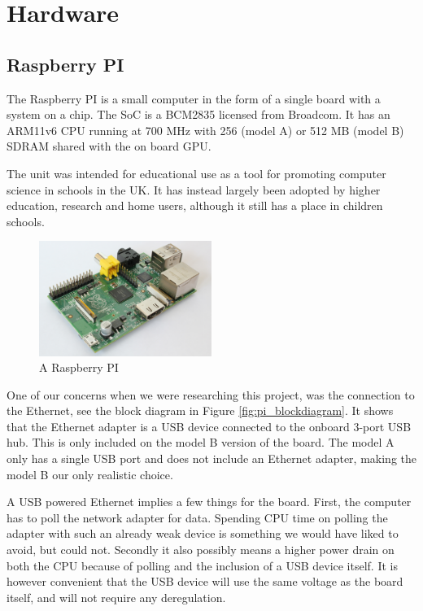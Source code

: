 \clearpage
\section{Hardware}
\label{sec:hardware}

\subsection{Raspberry PI}
The Raspberry PI is a small computer in the form of a single board with a system on a chip. The SoC is a BCM2835 licensed from Broadcom. It has an ARM11v6 CPU running at 700 MHz with 256 (model A) or 512 MB (model B) SDRAM shared with the on board GPU. 

The unit was intended for educational use as a tool for promoting computer science in schools in the UK. It has instead largely been adopted by higher education, research and home users, although it still has a place in children schools.

\begin{figure}[h]
    \centering
    \includegraphics[width=0.5\textwidth]{hardware/RaspberryPi}
    \caption{A Raspberry PI}
    \label{fig:raspberrypi_hw}
\end{figure}

One of our concerns when we were researching this project, was the connection to the Ethernet, see the block diagram in Figure \ref{fig:pi_blockdiagram}.
It shows that the Ethernet adapter is a USB device connected to the onboard 3-port USB hub. This is only included on the model B version of the board. 
The model A only has a single USB port and does not include an Ethernet adapter, making the model B our only realistic choice.

A USB powered Ethernet implies a few things for the board. First, the computer has to poll the network adapter for data. 
Spending CPU time on polling the adapter with such an already weak device is something we would have liked to avoid, but could not. Secondly it also possibly means a higher power drain on both the CPU because of polling and the inclusion of a USB device itself.
It is however convenient that the USB device will use the same voltage as the board itself, and will not require any deregulation. 

